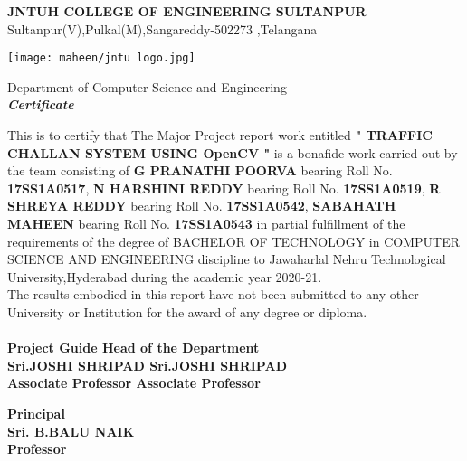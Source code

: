 \documentclass[12pt,a4paper]{report}
\begin{document}
\begin{center}

{\large\textbf{JNTUH COLLEGE OF ENGINEERING SULTANPUR}}\\
\textup{\normalsize {Sultanpur(V),Pulkal(M),Sangareddy-502273 ,Telangana}}\\[1cm]
\begin{center}
  \texttt{[image: maheen/jntu logo.jpg]}
\end{center}
{\large\textup {Department of Computer Science and Engineering}}\\[1.0cm]
{\Large \textbf{\textit{Certificate}}}\\

\end{center}
This is to certify that The Major Project report work entitled \textbf{ " TRAFFIC CHALLAN SYSTEM USING OpenCV " } is a bonafide work carried out by the team consisting of \textbf{ G PRANATHI POORVA }  bearing Roll No. \textbf{17SS1A0517}, \textbf{N HARSHINI REDDY } bearing Roll No.
\textbf{17SS1A0519}, \textbf{R SHREYA REDDY } bearing Roll No.
\textbf{17SS1A0542}, \textbf{SABAHATH MAHEEN} bearing Roll No.
\textbf{17SS1A0543} in partial fulfillment of the requirements of the degree of BACHELOR OF TECHNOLOGY in COMPUTER SCIENCE AND ENGINEERING discipline to Jawaharlal Nehru Technological University,Hyderabad during the academic year 2020-21.\\[.5cm]
The results embodied in this report have not been submitted to any other University or Institution for the award of any degree or diploma.\\
\vspace{1.5cm}\\
\textbf{Project Guide \hfill Head of the Department\\}
\textbf{Sri.JOSHI SHRIPAD  \hfill        Sri.JOSHI SHRIPAD \\}
\textbf{Associate Professor \hfill Associate Professor\\ }
\begin{center}
\vspace{1 cm}
\textbf{Principal\\}
\textbf{Sri. B.BALU NAIK}\\
\textbf{Professor}
\end{center}

\newpage
{}
\end{document}
